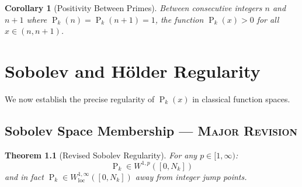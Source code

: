 ﻿\documentclass[12pt,a4paper]{report}
\theoremstyle{plain}
\newtheorem{theorem}{Theorem}[section]
\newtheorem{corollary}[theorem]{Corollary}
\theoremstyle{definition}
\DeclareMathOperator{\Pk}{P}
\begin{document}
\begin{corollary}[Positivity Between Primes]
Between consecutive integers $n$ and $n+1$ where $\Pk_k(n) = \Pk_k(n+1) = 1$, the function $\Pk_k(x) > 0$ for all $x \in (n, n+1)$.
\end{corollary}

\chapter{Sobolev and H\"older Regularity}
\label{ch:sobolev}

We now establish the precise regularity of $\Pk_k(x)$ in classical function spaces.

\section{Sobolev Space Membership --- \textsc{Major Revision}}

\begin{theorem}[Revised Sobolev Regularity]
\label{thm:sobolev_regularity}
For any $p \in [1,\infty)$:
\[
\Pk_k \in W^{1,p}([0, N_k])
\]
and in fact $\Pk_k \in W^{1,\infty}_{\text{loc}}([0,N_k])$ away from integer jump points.
\end{theorem}
\end{document}
